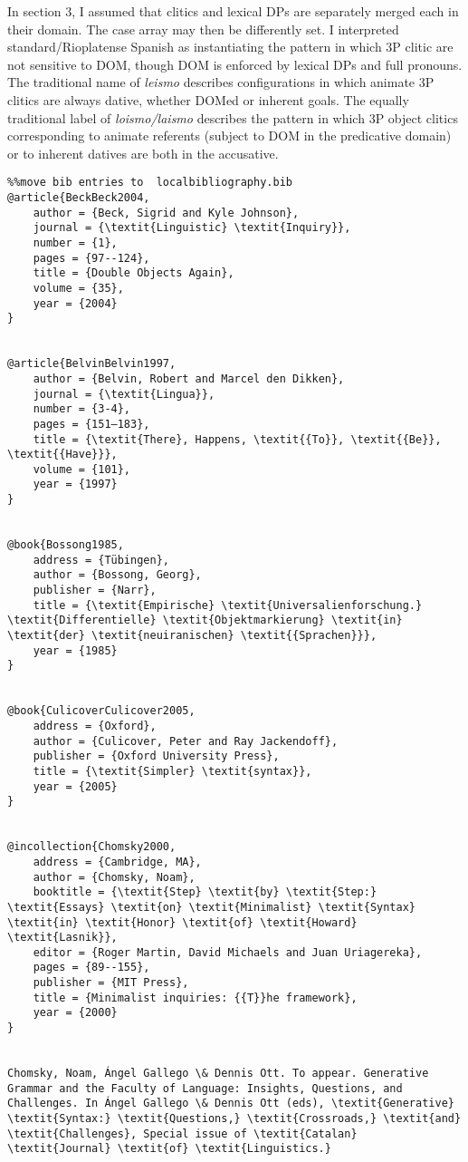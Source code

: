 \documentclass[output=paper,nonflat,modfonts]{langsci/langscibook}
\begin{document}
In section 3, I assumed that clitics and lexical DPs are separately merged each in their domain. The case array may then be differently set. I interpreted standard/Rioplatense Spanish as instantiating the pattern in which 3P clitic are not sensitive to DOM, though DOM is enforced by lexical DPs and full pronouns. The traditional name of \textit{leismo} describes configurations in which animate 3P clitics are always dative, whether DOMed or inherent goals. The equally traditional label of \textit{loismo/laismo} describes the pattern in which 3P object clitics corresponding to animate referents (subject to DOM in the predicative domain) or to inherent datives are both in the accusative. 
\begin{verbatim}%%move bib entries to  localbibliography.bib
@article{BeckBeck2004,
	author = {Beck, Sigrid and Kyle Johnson},
	journal = {\textit{Linguistic} \textit{Inquiry}},
	number = {1},
	pages = {97--124},
	title = {Double Objects Again},
	volume = {35},
	year = {2004}
}


@article{BelvinBelvin1997,
	author = {Belvin, Robert and Marcel den Dikken},
	journal = {\textit{Lingua}},
	number = {3-4},
	pages = {151–183},
	title = {\textit{There}, Happens, \textit{{To}}, \textit{{Be}}, \textit{{Have}}},
	volume = {101},
	year = {1997}
}


@book{Bossong1985,
	address = {Tübingen},
	author = {Bossong, Georg},
	publisher = {Narr},
	title = {\textit{Empirische} \textit{Universalienforschung.} \textit{Differentielle} \textit{Objektmarkierung} \textit{in} \textit{der} \textit{neuiranischen} \textit{{Sprachen}}},
	year = {1985}
}


@book{CulicoverCulicover2005,
	address = {Oxford},
	author = {Culicover, Peter and Ray Jackendoff},
	publisher = {Oxford University Press},
	title = {\textit{Simpler} \textit{syntax}},
	year = {2005}
}


@incollection{Chomsky2000,
	address = {Cambridge, MA},
	author = {Chomsky, Noam},
	booktitle = {\textit{Step} \textit{by} \textit{Step:} \textit{Essays} \textit{on} \textit{Minimalist} \textit{Syntax} \textit{in} \textit{Honor} \textit{of} \textit{Howard} \textit{Lasnik}},
	editor = {Roger Martin, David Michaels and Juan Uriagereka},
	pages = {89--155},
	publisher = {MIT Press},
	title = {Minimalist inquiries: {{T}}he framework},
	year = {2000}
}


Chomsky, Noam, Ángel Gallego \& Dennis Ott. To appear. Generative Grammar and the Faculty of Language: Insights, Questions, and Challenges. In Ángel Gallego \& Dennis Ott (eds), \textit{Generative} \textit{Syntax:} \textit{Questions,} \textit{Crossroads,} \textit{and} \textit{Challenges}, Special issue of \textit{Catalan} \textit{Journal} \textit{of} \textit{Linguistics.}


\end{verbatim}
\end{document}
